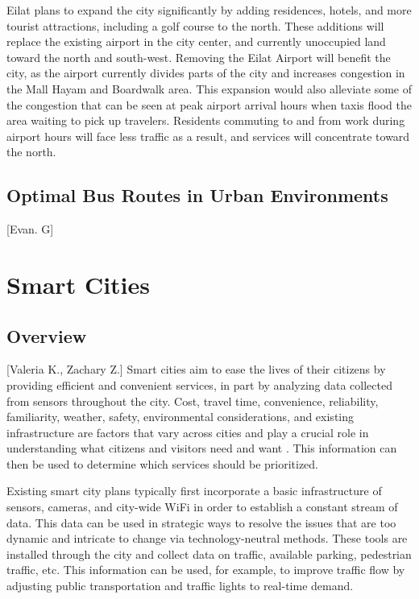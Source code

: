 \documentclass[12pt]{article}                               %
\begin{document}
Eilat plans to expand the city significantly by adding residences, hotels, and more tourist attractions, including a golf course to the north. These additions will replace the existing airport in the city center, and currently unoccupied land toward the north and south-west. Removing the Eilat Airport will benefit the city, as the airport currently divides parts of the city and increases congestion in the Mall Hayam and Boardwalk area. This expansion would also alleviate some of the congestion that can be seen at peak airport arrival hours when taxis flood the area waiting to pick up travelers. Residents commuting to and from work during airport hours will face less traffic as a result, and services will concentrate toward the north. 

\subsection{Optimal Bus Routes in Urban Environments}[Evan. G]


\newpage
\section{Smart Cities}\label{sec:smart_cities}
\subsection{Overview}[Valeria K., Zachary Z.]
Smart cities aim  to ease the lives of their citizens by providing efficient and convenient services, in part by analyzing data collected from sensors throughout the city. Cost, travel time, convenience, reliability, familiarity, weather, safety, environmental considerations, and existing infrastructure are factors that vary across cities and play a crucial role in understanding what citizens and visitors need and want \cite{2016LiveChallenge}. This information can then be used to determine which services should be prioritized.

Existing smart city plans typically first incorporate a basic infrastructure of sensors, cameras, and city-wide WiFi in order to establish a constant stream of data. This data can be used in strategic ways to resolve the issues that are too dynamic and intricate to change via technology-neutral methods. These tools are installed through the city and collect data on traffic, available parking, pedestrian traffic, etc. This information can be used, for example, to improve traffic flow by adjusting public transportation and traffic lights to real-time demand.
\end{document}
